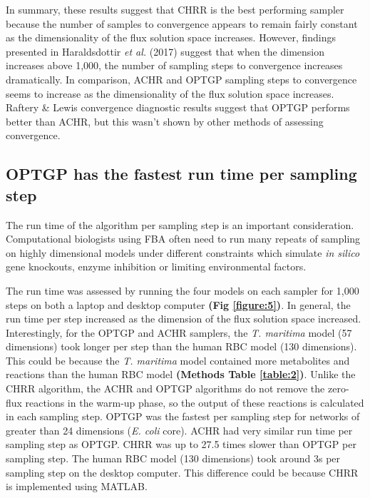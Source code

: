 \documentclass[10pt,letterpaper]{article}
\begin{document}
In summary, these results suggest that CHRR is the best performing sampler because the number of samples to convergence appears to remain fairly constant as the dimensionality of the flux solution space increases. However, findings presented in Haraldsdottir \textit{et al.} (2017) suggest that when the dimension increases above 1,000, the number of sampling steps to convergence increases dramatically\cite{Haraldsdottir}. In comparison, ACHR and OPTGP sampling steps to convergence seems to increase as the dimensionality of the flux solution space increases. Raftery \& Lewis convergence diagnostic results suggest that OPTGP performs better than ACHR, but this wasn’t shown by other methods of assessing convergence. 

\subsection*{OPTGP has the fastest run time per sampling step}
The run time of the algorithm per sampling step is an important consideration. Computational biologists using FBA often need to run many repeats of sampling on highly dimensional models under different constraints which simulate \textit{in silico} gene knockouts, enzyme inhibition or limiting environmental factors. 

The run time was assessed by running the four models on each sampler for 1,000 steps on both a laptop and desktop computer \textbf{(Fig \ref{figure:5})}. In general, the run time per step increased as the dimension of the flux solution space increased. Interestingly, for the OPTGP and ACHR samplers, the \textit{T. maritima} model (57 dimensions) took longer per step than the human RBC model (130 dimensions). This could be because the \textit{T. maritima} model contained more metabolites and reactions than the human RBC model \textbf{(Methods Table \ref{table:2})}. Unlike the CHRR algorithm, the ACHR and OPTGP algorithms do not remove the zero-flux reactions in the warm-up phase, so the output of these reactions is calculated in each sampling step. OPTGP was the fastest per sampling step for networks of greater than 24 dimensions (\textit{E. coli} core). ACHR had very similar run time per sampling step as OPTGP. CHRR was up to 27.5 times slower than OPTGP per sampling step. The human RBC model (130 dimensions) took around 3s per sampling step on the desktop computer. This difference could be because CHRR is implemented using MATLAB.
\end{document}
